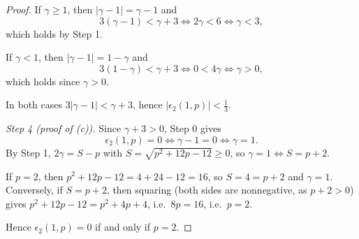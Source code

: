 \begin{proof}
If $\gamma\ge1$, then $|\gamma-1|=\gamma-1$ and
\[
  3(\gamma-1)<\gamma+3\iff 2\gamma<6\iff\gamma<3,
\]
which holds by Step 1.

If $\gamma<1$, then $|\gamma-1|=1-\gamma$ and
\[
  3(1-\gamma)<\gamma+3\iff 0<4\gamma\iff\gamma>0,
\]
which holds since $\gamma>0$.

In both cases $3|\gamma-1|<\gamma+3$, hence $|\epsilon_2(1,p)|<\frac13$.

\emph{Step 4 (proof of (c)).}  Since $\gamma+3>0$, Step 0 gives
\[
  \epsilon_2(1,p)=0\iff\gamma-1=0\iff\gamma=1 .
\]
By Step 1, $2\gamma=S-p$ with $S=\sqrt{p^2+12p-12}\ge0$, so
$\gamma=1\iff S=p+2$.

If $p=2$, then $p^2+12p-12=4+24-12=16$, so $S=4=p+2$ and $\gamma=1$.
Conversely, if $S=p+2$, then squaring (both sides are nonnegative, as
$p+2>0$) gives $p^2+12p-12=p^2+4p+4$, i.e.\ $8p=16$, i.e.\ $p=2$.

Hence $\epsilon_2(1,p)=0$ if and only if $p=2$.
\end{proof}
